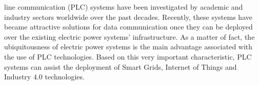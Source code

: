 \documentclass[journal]{IEEEtran}
\begin{document}
%


 line communication (PLC) systems have been investigated by academic and industry sectors worldwide over the past decades. Recently, these systems have became attractive solutions for data communication once they can be deployed over the existing electric power systems' infrastructure. As a matter of fact, the ubiquitousness of electric power systems is the main advantage associated with the use of \ac{PLC} technologies. Based on this very important characteristic, \ac{PLC} systems can assist the deployment of Smart Grids, Internet of Things and Industry $4.0$ technologies. 
\end{document}
